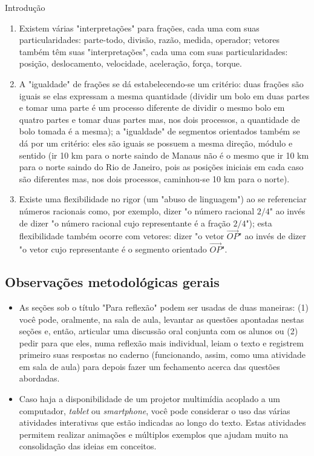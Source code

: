 \begin{apresentacao}{Introdução}
\begin{enumerate}
\item {} 
Existem várias "interpretações"{} para frações, cada uma com suas particularidades: parte-todo, divisão, razão, medida, operador; vetores também têm suas "interpretações", cada uma com suas particularidades: posição, deslocamento, velocidade, aceleração, força, torque.

\item {} 
A "igualdade"{} de frações se dá estabelecendo-se um critério: duas frações são iguais se elas expressam a mesma quantidade (dividir um bolo em duas partes e tomar uma parte é um processo diferente de dividir o mesmo bolo em quatro partes e tomar duas partes mas, nos dois processos, a quantidade de bolo tomada é a mesma); a "igualdade"{} de segmentos orientados também se dá por um critério: eles são iguais se possuem a mesma direção, módulo e sentido (ir 10 km para o norte saindo de Manaus não é o mesmo que ir 10 km para o norte saindo do Rio de Janeiro, pois as posições iniciais em cada caso são diferentes mas, nos dois processos, caminhou-se 10 km para o norte).

\item {} 
Existe uma flexibilidade no rigor (um "abuso de linguagem") ao se referenciar números racionais como, por exemplo, dizer  "o número racional \(2/4\)"{} ao invés de dizer "o número racional cujo representante é a fração \(2/4\)"); esta flexibilidade também ocorre com vetores: dizer "o vetor \(\overrightarrow{OP}\)"{} ao invés de dizer "o vetor cujo representante é o segmento orientado \(\overrightarrow{OP}\)".

\end{enumerate}

\subsection{Observações metodológicas gerais}
\begin{itemize}
\item {} 
As seções sob o título "Para reflexão"{} podem ser usadas de duas maneiras: (1) você pode, oralmente, na sala de aula, levantar as questões apontadas nestas seções e, então, articular uma discussão oral conjunta com os alunos ou (2) pedir para que eles, numa reflexão mais individual, leiam o texto e registrem primeiro suas respostas no caderno (funcionando, assim, como uma atividade em sala de aula) para depois fazer um fechamento acerca das questões abordadas.

\item {} 
Caso haja a disponibilidade de um projetor multimídia acoplado a um computador, \textit{tablet} ou \textit{smartphone}, você pode considerar o uso das várias atividades interativas que estão indicadas ao longo do texto. Estas atividades permitem realizar animações e   múltiplos exemplos que ajudam muito na consolidação das ideias em conceitos.

\end{itemize}
\end{apresentacao}


